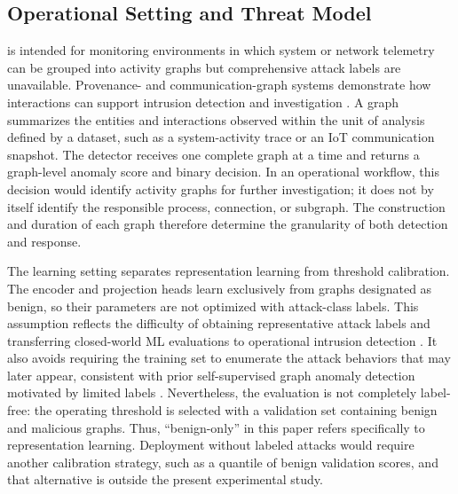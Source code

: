 \subsection{Operational Setting and Threat Model}

\sysname{} is intended for monitoring environments in which system or network telemetry can be grouped into activity graphs but comprehensive attack labels are unavailable. Provenance- and communication-graph systems demonstrate how interactions can support intrusion detection and investigation \cite{manzoor2016streamspot,cheng2024kairos,lo2022egraphsage}. A graph summarizes the entities and interactions observed within the unit of analysis defined by a dataset, such as a system-activity trace or an IoT communication snapshot. The detector receives one complete graph at a time and returns a graph-level anomaly score and binary decision. In an operational workflow, this decision would identify activity graphs for further investigation; it does not by itself identify the responsible process, connection, or subgraph. The construction and duration of each graph therefore determine the granularity of both detection and response.

The learning setting separates representation learning from threshold calibration. The encoder and projection heads learn exclusively from graphs designated as benign, so their parameters are not optimized with attack-class labels. This assumption reflects the difficulty of obtaining representative attack labels and transferring closed-world ML evaluations to operational intrusion detection \cite{sommer2010outside}. It also avoids requiring the training set to enumerate the attack behaviors that may later appear, consistent with prior self-supervised graph anomaly detection motivated by limited labels \cite{caville2022anomale}. Nevertheless, the evaluation is not completely label-free: the operating threshold is selected with a validation set containing benign and malicious graphs. Thus, ``benign-only'' in this paper refers specifically to representation learning. Deployment without labeled attacks would require another calibration strategy, such as a quantile of benign validation scores, and that alternative is outside the present experimental study.

